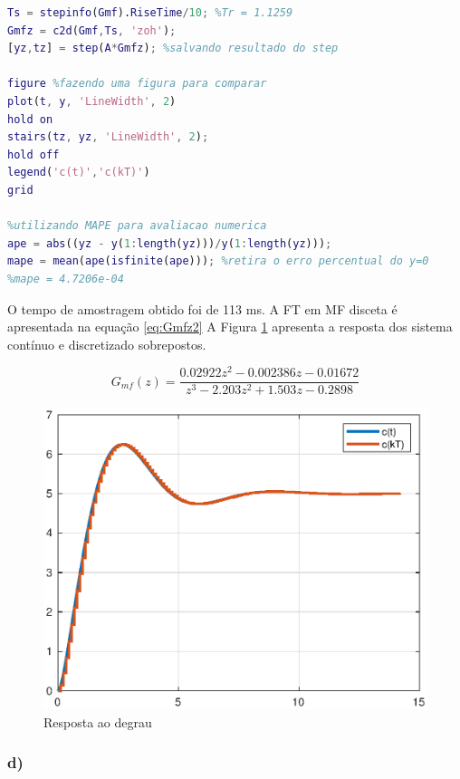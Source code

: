     \begin{lstlisting}[language=Matlab,label=Q2C,caption= Análise da estabilidade]
Ts = stepinfo(Gmf).RiseTime/10; %Tr = 1.1259
Gmfz = c2d(Gmf,Ts, 'zoh');
[yz,tz] = step(A*Gmfz); %salvando resultado do step

figure %fazendo uma figura para comparar
plot(t, y, 'LineWidth', 2)
hold on
stairs(tz, yz, 'LineWidth', 2);
hold off
legend('c(t)','c(kT)')
grid

%utilizando MAPE para avaliacao numerica
ape = abs((yz - y(1:length(yz)))/y(1:length(yz))); 
mape = mean(ape(isfinite(ape))); %retira o erro percentual do y=0
%mape = 4.7206e-04
    \end{lstlisting}

    O tempo de amostragem obtido foi de 113 ms. A FT em MF disceta é apresentada na equação \ref{eq:Gmfz2}
    A Figura \ref{fig:Stepctds2} apresenta a resposta dos sistema
    contínuo e discretizado sobrepostos. 

    \begin{equation}
        G_{mf}(z) = \frac{0.02922 z^2 - 0.002386 z - 0.01672}{z^3 - 2.203 z^2 + 1.503 z - 0.2898}
        \label{eq:Gmfz2}
    \end{equation}

    \begin{figure}[!ht]
        \centering
        \includegraphics[width = 0.75\linewidth]{Figuras/ProblemasPI/Problema2/stepContinuoDiscreto.eps}
        \caption{Resposta ao degrau}
        \label{fig:Stepctds2}                   
    \end{figure}

    \subsubsection*{d)}

